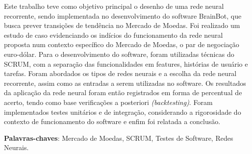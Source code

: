 \begin{resumo}
  Este trabalho teve como objetivo principal o desenho de uma rede neural
  recorrente, sendo implementada no desenvolvimento do software BrainBot, que
  busca prever transições de tendência no Mercado de Moedas. Foi realizado um
  estudo de caso evidenciando os indícios do funcionamento da rede neural
  proposta num contexto específico do Mercado de Moedas, o par de negociação
  euro-dólar. Para o desenvolvimento do software, foram utilizadas técnicas
  do SCRUM, com a separação das funcionalidades em features, histórias de
  usuário e tarefas. Foram abordados os tipos de redes neurais e a escolha
  da rede neural recorrente, assim como as entradas a serem utilizadas
  no software. Os resultados da aplicação da rede neural foram então registrados
  em forma de percentual de acerto, tendo como base verificações a posteriori
  \textit{(backtesting)}. Foram implementados testes unitários e de integração,
  considerando a rigorosidade do contexto de funcionamento do software e enfim
  foi relatada a conclusão.

 \vspace{\onelineskip}

 \noindent
 \textbf{Palavras-chaves}: Mercado de Moedas, SCRUM, Testes de Software, Redes
 Neurais.
\end{resumo}
